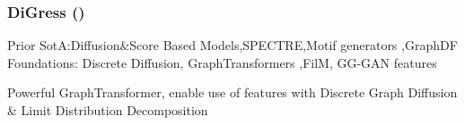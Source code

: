 \documentclass[./presentation.tex]{subfiles}
\begin{document}
\begin{frame}[t,label=digress]
  \frametitle{DiGress (\cite{vignacDiGressDiscreteDenoising2023b})}
  \vspace{-1cm}
\footnotesize
\begin{priorart}
{\footnotesize
    Prior SotA:Diffusion\&Score Based Models\citep{niuPermutationInvariantGraph2020b,songGenerativeModelingEstimating2019b},SPECTRE\citep{martinkusSPECTRESpectralConditioning2022b},Motif generators \citep{maziarzLearningExtendMolecular2021},GraphDF\citep{luoGraphDFDiscreteFlow2021d}
\\
Foundations: Discrete Diffusion\citep{austinStructuredDenoisingDiffusion2021e}, GraphTransformers \citep{vaswaniAttentionAllYou2017c,yunGraphTransformerNetworks2019b},FilM\citep{perezFiLMVisualReasoning2018b}, GG-GAN features \citep{krawczukGGGANGeometricGraph2020}
 }
  \end{priorart}
  \begin{contributions}
    Powerful GraphTransformer, enable use of features with Discrete Graph Diffusion \& Limit Distribution Decomposition 
  \end{contributions}
  \vspace{-0.5cm}
  \begin{columns}
        \footnotesize
    \begin{column}{0.5\textwidth}
    \end{column}
    \begin{column}{0.5\textwidth}
    \end{column}
  \end{columns}
    \vspace{1cm}
  
\end{frame}
\end{document}
